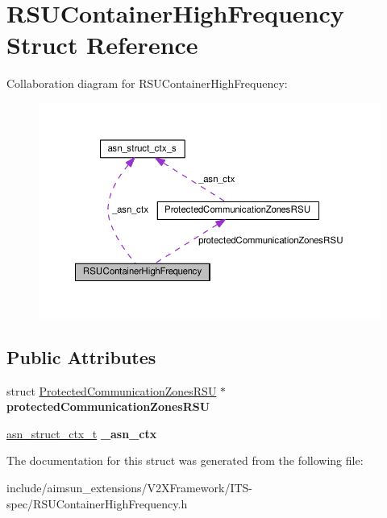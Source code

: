 \hypertarget{structRSUContainerHighFrequency}{}\section{R\+S\+U\+Container\+High\+Frequency Struct Reference}
\label{structRSUContainerHighFrequency}


Collaboration diagram for R\+S\+U\+Container\+High\+Frequency\+:\nopagebreak
\begin{figure}[H]
\begin{center}
\leavevmode
\includegraphics[width=350pt]{structRSUContainerHighFrequency__coll__graph}
\end{center}
\end{figure}
\subsection*{Public Attributes}
\begin{DoxyCompactItemize}
\item 
struct \hyperlink{structProtectedCommunicationZonesRSU}{Protected\+Communication\+Zones\+R\+SU} $\ast$ {\bfseries protected\+Communication\+Zones\+R\+SU}\hypertarget{structRSUContainerHighFrequency_a60f06538d76453f5e8065de29c7f06ab}{}\label{structRSUContainerHighFrequency_a60f06538d76453f5e8065de29c7f06ab}

\item 
\hyperlink{structasn__struct__ctx__s}{asn\+\_\+struct\+\_\+ctx\+\_\+t} {\bfseries \+\_\+asn\+\_\+ctx}\hypertarget{structRSUContainerHighFrequency_a13f5d38e207f2e2e776abc821dc4f55e}{}\label{structRSUContainerHighFrequency_a13f5d38e207f2e2e776abc821dc4f55e}

\end{DoxyCompactItemize}


The documentation for this struct was generated from the following file\+:\begin{DoxyCompactItemize}
\item 
include/aimsun\+\_\+extensions/\+V2\+X\+Framework/\+I\+T\+S-\/spec/R\+S\+U\+Container\+High\+Frequency.\+h\end{DoxyCompactItemize}
